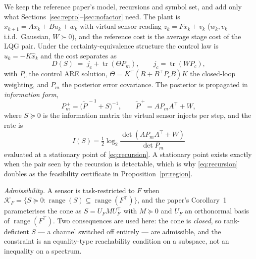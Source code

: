 \documentclass[journal]{IEEEtran}
\theoremstyle{remark}
\begin{document}
We keep the reference paper's model, recursions and symbol set, and add only
what Sections~\ref{sec:repro}--\ref{sec:nofactor} need. The plant is
$x_{k+1}=Ax_k+Bu_k+w_k$ with virtual-sensor reading $z_k=Fx_k+v_k$
($w_k,v_k$ i.i.d.\ Gaussian, $W\succ0$), and the reference cost is the average
stage cost of the LQG pair. Under the certainty-equivalence structure the control
law is $u_k=-K\hat x_k$ and the cost separates as
\begin{equation}
 D(S)\;=\;j_c+\operatorname{tr}(\Theta P_m),\qquad
 j_c=\operatorname{tr}(WP_c),
\label{eq:cost}
\end{equation}
with $P_c$ the control ARE solution, $\Theta=K^{\top}(R+B^{\top}P_cB)K$ the
closed-loop weighting, and $P_m$ the posterior error covariance. The
posterior is propagated in \emph{information form},
\begin{equation}
 P_m^{\,+}=\big(\tilde P^{\,-1}+S\big)^{-1},\qquad
 \tilde P^{\,+}=AP_mA^{\top}+W,
\label{eq:recursion}
\end{equation}
where $S\succeq0$ is the information matrix the virtual sensor injects per step,
and the rate is
\begin{equation}
 I(S)=\tfrac12\log_2\frac{\det(AP_mA^{\top}+W)}{\det P_m}
\label{eq:rate}
\end{equation}
evaluated at a stationary point of \eqref{eq:recursion}. A stationary point
exists exactly when the pair seen by the recursion is detectable, which is why
\eqref{eq:recursion} doubles as the feasibility certificate in
Proposition~\ref{pr:region}.

\emph{Admissibility.} A sensor is task-restricted to $F$ when
$\mathcal K_F=\{S\succeq0:\operatorname{range}(S)\subseteq
\operatorname{range}(F^{\top})\}$, and the paper's Corollary~1 parameterises the
cone as $S=U_FMU_F^{\top}$ with $M\succeq0$ and $U_F$ an orthonormal basis of
$\operatorname{range}(F^{\top})$. Two consequences are used here: the cone is
\emph{closed}, so rank-deficient $S$ --- a channel switched off entirely --- are
admissible, and the constraint is an equality-type reachability condition on a
subspace, not an inequality on a spectrum.
\end{document}
